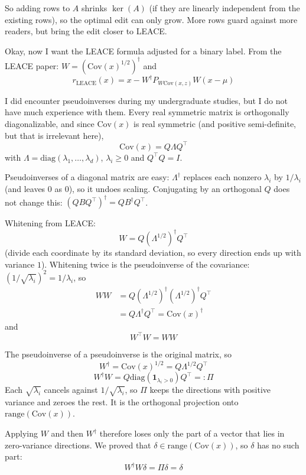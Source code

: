 \documentclass[10pt,a4paper,twocolumn]{article}
\begin{document}
	So adding rows to $A$ shrinks $\ker(A)$ (if they are linearly independent from the existing rows), so the optimal edit can only grow. More rows guard against more readers, but bring the edit closer to LEACE.

	Okay, now I want the LEACE formula adjusted for a binary label. From the LEACE paper: $W = \left( \mathrm{Cov}(x)^{1/2} \right)^\dagger$ and
	$$r_{\mathrm{LEACE}}(x) = x - W^\dagger P_{W \mathrm{Cov}(x, z)} W (x - \mu)$$

	I did encounter pseudoinverses during my undergraduate studies, but I do not have much experience with them. Every real symmetric matrix is orthogonally diagonalizable, and since $\mathrm{Cov}(x)$ is real symmetric (and positive semi-definite, but that is irrelevant here),
	$$\mathrm{Cov}(x) = Q \Lambda Q^\top$$
	with $\Lambda = \mathrm{diag}(\lambda_1, \dots, \lambda_d)$, $\lambda_i \ge 0$ and $Q^\top Q = I$.

	Pseudoinverses of a diagonal matrix are easy: $\Lambda^\dagger$ replaces each nonzero $\lambda_i$ by $1 / \lambda_i$ (and leaves $0$ as $0$), so it undoes scaling. Conjugating by an orthogonal $Q$ does not change this: $(Q B Q^\top)^\dagger = Q B^\dagger Q^\top$.

	Whitening from LEACE:
	$$W = Q (\Lambda^{1/2})^\dagger Q^\top$$
	(divide each coordinate by its standard deviation, so every direction ends up with variance $1$). Whitening twice is the pseudoinverse of the covariance: $\left( 1 / \sqrt{\lambda_i} \right)^2 = 1 / \lambda_i$, so
	$$\begin{aligned}
		W W & = Q (\Lambda^{1/2})^\dagger (\Lambda^{1/2})^\dagger Q^\top \\
		& = Q \Lambda^\dagger Q^\top = \mathrm{Cov}(x)^\dagger
	\end{aligned}$$
	and
	$$W^\top W = W W$$

	The pseudoinverse of a pseudoinverse is the original matrix, so
	$$W^\dagger = \mathrm{Cov}(x)^{1/2} = Q \Lambda^{1/2} Q^\top$$
	$$W^\dagger W = Q \mathrm{diag}(\mathbf{1}_{\lambda_i > 0}) Q^\top =: \Pi$$
	Each $\sqrt{\lambda_i}$ cancels against $1 / \sqrt{\lambda_i}$, so $\Pi$ keeps the directions with positive variance and zeroes the rest. It is the orthogonal projection onto $\mathrm{range}(\mathrm{Cov}(x))$.

	Applying $W$ and then $W^\dagger$ therefore loses only the part of a vector that lies in zero-variance directions. We proved that $\delta \in \mathrm{range}(\mathrm{Cov}(x))$, so $\delta$ has no such part:
	$$W^\dagger W \delta = \Pi \delta = \delta$$
\end{document}
